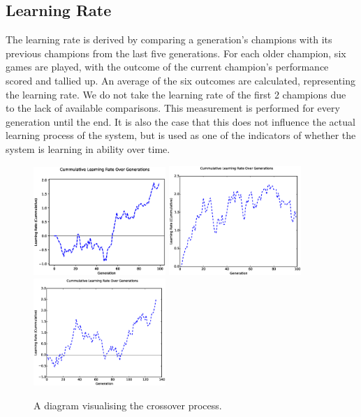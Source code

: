 \documentclass[12pt,a4paper]{article}
\begin{document}
    \subsection{Learning Rate}
    
    The learning rate is derived by comparing a generation's champions with its previous champions from the last five generations. For each older champion, six games are played, with the outcome of the current champion's performance scored and tallied up. An average of the six outcomes are calculated, representing the learning rate. We do not take the learning rate of the first 2 champions due to the lack of available comparisons. This measurement is performed for every generation until the end. It is also the case that this does not influence the actual learning process of the system, but is used as one of the indicators of whether the system is learning in ability over time.
    
    \begin{figure}[!h]
        \centering
        \includegraphics[width=50mm]{images/results/1ply/cummulative_growth.eps}
        \includegraphics[width=50mm]{images/results/3ply/cummulative_growth.eps}
        \includegraphics[width=50mm]{images/results/6ply/cummulative_growth.eps}
        \caption{A diagram visualising the crossover process.\label{cum_growth}}
    \end{figure}
    
\end{document}
